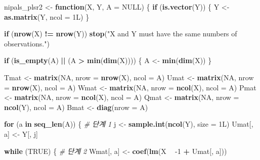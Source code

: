 \documentclass[]{book}
\newenvironment{Shaded}{\begin{snugshade}}{\end{snugshade}}
\newcommand{\CommentTok}[1]{\textcolor[rgb]{0.56,0.35,0.01}{\textit{#1}}}
\newcommand{\ControlFlowTok}[1]{\textcolor[rgb]{0.13,0.29,0.53}{\textbf{#1}}}
\newcommand{\DataTypeTok}[1]{\textcolor[rgb]{0.13,0.29,0.53}{#1}}
\newcommand{\DecValTok}[1]{\textcolor[rgb]{0.00,0.00,0.81}{#1}}
\newcommand{\KeywordTok}[1]{\textcolor[rgb]{0.13,0.29,0.53}{\textbf{#1}}}
\newcommand{\NormalTok}[1]{#1}
\newcommand{\OperatorTok}[1]{\textcolor[rgb]{0.81,0.36,0.00}{\textbf{#1}}}
\newcommand{\OtherTok}[1]{\textcolor[rgb]{0.56,0.35,0.01}{#1}}
\newcommand{\StringTok}[1]{\textcolor[rgb]{0.31,0.60,0.02}{#1}}
\begin{document}
\begin{Shaded}
\begin{Highlighting}[]
\NormalTok{nipals_plsr2 <-}\StringTok{ }\ControlFlowTok{function}\NormalTok{(X, Y, }\DataTypeTok{A =} \OtherTok{NULL}\NormalTok{) \{}
  \ControlFlowTok{if}\NormalTok{ (}\KeywordTok{is.vector}\NormalTok{(Y)) \{}
\NormalTok{    Y <-}\StringTok{ }\KeywordTok{as.matrix}\NormalTok{(Y, }\DataTypeTok{ncol =}\NormalTok{ 1L)}
\NormalTok{  \}}
  
  \ControlFlowTok{if}\NormalTok{ (}\KeywordTok{nrow}\NormalTok{(X) }\OperatorTok{!=}\StringTok{ }\KeywordTok{nrow}\NormalTok{(Y)) }\KeywordTok{stop}\NormalTok{(}\StringTok{"X and Y must have the same numbers of observations."}\NormalTok{)}
  
  \ControlFlowTok{if}\NormalTok{ (}\KeywordTok{is_empty}\NormalTok{(A) }\OperatorTok{||}\StringTok{ }\NormalTok{(A }\OperatorTok{>}\StringTok{ }\KeywordTok{min}\NormalTok{(}\KeywordTok{dim}\NormalTok{(X)))) \{}
\NormalTok{    A <-}\StringTok{ }\KeywordTok{min}\NormalTok{(}\KeywordTok{dim}\NormalTok{(X))}
\NormalTok{  \}}
  
\NormalTok{  Tmat <-}\StringTok{ }\KeywordTok{matrix}\NormalTok{(}\OtherTok{NA}\NormalTok{, }\DataTypeTok{nrow =} \KeywordTok{nrow}\NormalTok{(X), }\DataTypeTok{ncol =}\NormalTok{ A)}
\NormalTok{  Umat <-}\StringTok{ }\KeywordTok{matrix}\NormalTok{(}\OtherTok{NA}\NormalTok{, }\DataTypeTok{nrow =} \KeywordTok{nrow}\NormalTok{(X), }\DataTypeTok{ncol =}\NormalTok{ A)}
\NormalTok{  Wmat <-}\StringTok{ }\KeywordTok{matrix}\NormalTok{(}\OtherTok{NA}\NormalTok{, }\DataTypeTok{nrow =} \KeywordTok{ncol}\NormalTok{(X), }\DataTypeTok{ncol =}\NormalTok{ A)}
\NormalTok{  Pmat <-}\StringTok{ }\KeywordTok{matrix}\NormalTok{(}\OtherTok{NA}\NormalTok{, }\DataTypeTok{nrow =} \KeywordTok{ncol}\NormalTok{(X), }\DataTypeTok{ncol =}\NormalTok{ A)}
\NormalTok{  Qmat <-}\StringTok{ }\KeywordTok{matrix}\NormalTok{(}\OtherTok{NA}\NormalTok{, }\DataTypeTok{nrow =} \KeywordTok{ncol}\NormalTok{(Y), }\DataTypeTok{ncol =}\NormalTok{ A)}
\NormalTok{  Bmat <-}\StringTok{ }\KeywordTok{diag}\NormalTok{(}\DataTypeTok{nrow =}\NormalTok{ A)}
  
  \ControlFlowTok{for}\NormalTok{ (a }\ControlFlowTok{in} \KeywordTok{seq_len}\NormalTok{(A)) \{}
    \CommentTok{# 단계 1}
\NormalTok{    j <-}\StringTok{ }\KeywordTok{sample.int}\NormalTok{(}\KeywordTok{ncol}\NormalTok{(Y), }\DataTypeTok{size =}\NormalTok{ 1L)}
\NormalTok{    Umat[, a] <-}\StringTok{ }\NormalTok{Y[, j]}
    
    \ControlFlowTok{while}\NormalTok{ (}\OtherTok{TRUE}\NormalTok{) \{}
      \CommentTok{# 단계 2}
\NormalTok{      Wmat[, a] <-}\StringTok{ }\KeywordTok{coef}\NormalTok{(}\KeywordTok{lm}\NormalTok{(X }\OperatorTok{~}\StringTok{ }\DecValTok{-1} \OperatorTok{+}\StringTok{ }\NormalTok{Umat[, a]))}
      

\end{Highlighting}
\end{Shaded}
\end{document}
